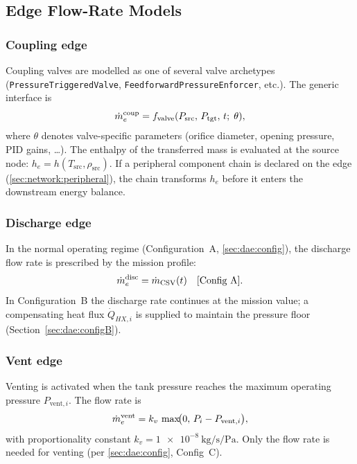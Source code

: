 \subsection{Edge Flow-Rate Models}
\label{sec:dae:edges}

\subsubsection{Coupling edge}

Coupling valves are modelled as one of several valve archetypes
(\texttt{PressureTriggeredValve}, \texttt{FeedforwardPressureEnforcer}, etc.).
The generic interface is
\begin{equation}
  \dot{m}_e^{\text{coup}} = f_\text{valve}(P_\text{src},\, P_\text{tgt},\, t;\; \theta),
\end{equation}
where $\theta$ denotes valve-specific parameters (orifice diameter, opening
pressure, PID gains, \dots).  The enthalpy of the transferred mass is evaluated
at the source node: $h_e = h(T_\text{src}, \rho_\text{src})$.  If a peripheral
component chain is declared on the edge (\cref{sec:network:peripheral}), the
chain transforms $h_e$ before it enters the downstream energy balance.

\subsubsection{Discharge edge}

In the normal operating regime (Configuration~A, \cref{sec:dae:config}), the
discharge flow rate is prescribed by the mission profile:
\begin{equation}
  \dot{m}_e^{\text{disc}} = \dot{m}_\text{CSV}(t) \quad [\text{Config~A}].
\end{equation}
In Configuration~B the discharge rate continues at the mission value;
a compensating heat flux $\dot{Q}_{HX,i}$ is supplied to maintain the
pressure floor (Section~\ref{sec:dae:configB}).

\subsubsection{Vent edge}

Venting is activated when the tank pressure reaches the maximum operating
pressure $P_{\text{vent},i}$.  The flow rate is
\begin{equation}
  \dot{m}_e^{\text{vent}} = k_v\,\max\!\bigl(0,\, P_i - P_{\text{vent},i}\bigr),
  \label{eq:vent-rate}
\end{equation}
with proportionality constant $k_v = \SI{1e-8}{\kilogram\per\second\per\pascal}$.
Only the flow rate is needed for venting (per \cref{sec:dae:config}, Config~C).

